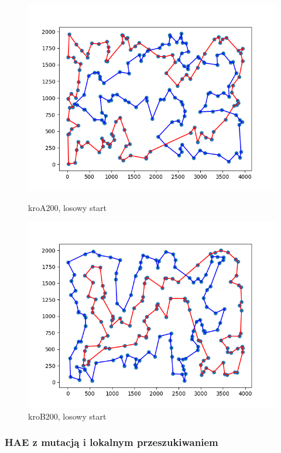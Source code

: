 \documentclass[11pt]{article}
\begin{document}
\begin{figure}[H]
    \begin{minipage}[t]{0.45\textwidth}
        \centering
        \includegraphics[width=\linewidth]{best_paths/kroA200/HAE+LS}
        \caption{kroA200, losowy start}
    \end{minipage}
    \hfill
    \begin{minipage}[t]{0.45\textwidth}
        \centering
        \includegraphics[width=\linewidth]{best_paths/kroB200/HAE+LS}
        \caption{kroB200, losowy start}
    \end{minipage}\label{fig:figure7}
\end{figure}


\subsubsection{HAE z mutacją i lokalnym przeszukiwaniem}
\end{document}
